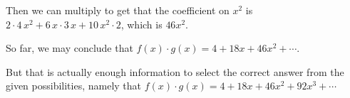 \documentclass{ximera}
\begin{document}
\begin{question}
\begin{solution}
\begin{hint}
    \end{hint}
    \begin{hint}
      Then we can multiply to get that the coefficient on \(x^2\) is \( 2 \cdot 4 \, x^{2} + 6 \, x \cdot 3 \, x + 10 \, x^{2} \cdot 2 \), which is \(46 x^2\).
    \end{hint}
    \begin{hint}
      So far, we may conclude that \(f(x) \cdot g(x) =  4+ 18 x +46 x^{2}  + \cdots\).
    \end{hint}
    \begin{hint}
      But that is actually enough information to select the correct answer from the given possibilities, namely that \(f(x) \cdot g(x) =  4+ 18 x + 46 x^{2} +92 x^{3}  + \cdots\)
    \end{hint}


    \begin{multiple-choice}
    \end{multiple-choice}

  \end{solution}
\end{question}
\end{document}
